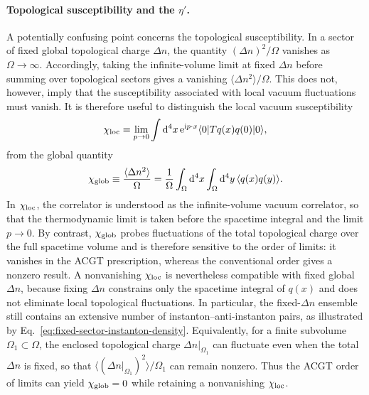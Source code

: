 \documentclass[review]{elsarticle}
\numberwithin{equation}{section}
\numberwithin{table}{section}
\numberwithin{figure}{section}
\def\d{\mathrm{d}}
\def\i{\mathrm{i}}
\def\e{\mathrm{e}}
\begin{document}
\paragraph{Topological susceptibility and the \texorpdfstring{$\eta'$}{eta-prime}.}

A potentially confusing point concerns the topological susceptibility. In a sector of fixed global topological charge $\Delta n$, the quantity $(\Delta n)^2/\Omega$ vanishes as $\Omega\to\infty$. Accordingly, taking the infinite-volume limit at fixed $\Delta n$ before summing over topological sectors gives a vanishing $\langle\Delta n^2\rangle/\Omega$. This does not, however, imply that the susceptibility associated with local vacuum fluctuations must vanish. It is therefore useful to distinguish the local vacuum susceptibility~\cite{Ai:2020ptm,Ai:2025quf}
\begin{align}
    \chi_{\rm loc}
    \equiv
    \lim_{p\to0}
    \int\d^4x\,
    \e^{\i p\cdot x}
    \langle0|
        T q(x)q(0)
    |0\rangle ,
    \label{eq:local-topological-susceptibility-reassessment}
\end{align}
from the global quantity
\begin{align}
    \chi_{\rm glob}
    \equiv
    \frac{\langle\Delta n^2\rangle}{\Omega}
    =
    \frac{1}{\Omega}
    \int_\Omega\d^4x
    \int_\Omega\d^4y\,
    \langle q(x)q(y)\rangle .
\end{align}
In $\chi_{\rm loc}$, the correlator is understood as the infinite-volume vacuum correlator, so that the thermodynamic limit is taken before the spacetime integral and the limit $p\to0$. By contrast, $\chi_{\rm glob}$ probes fluctuations of the total topological charge over the full spacetime volume and is therefore sensitive to the order of limits: it vanishes in the ACGT prescription, whereas the conventional order gives a nonzero result. A nonvanishing $\chi_{\rm loc}$ is nevertheless compatible with fixed global $\Delta n$, because fixing $\Delta n$ constrains only the spacetime integral of $q(x)$ and does not eliminate local topological fluctuations. In particular, the fixed-$\Delta n$ ensemble still contains an extensive number of instanton--anti-instanton pairs, as illustrated by Eq.~\eqref{eq:fixed-sector-instanton-density}. Equivalently, for a finite subvolume $\Omega_1\subset\Omega$, the enclosed topological charge $\Delta n|_{\Omega_1}$ can fluctuate even when the total $\Delta n$ is fixed, so that $\langle(\Delta n|_{\Omega_1})^2\rangle/\Omega_1$ can remain nonzero. Thus the ACGT order of limits can yield $\chi_{\rm glob}=0$ while retaining a nonvanishing $\chi_{\rm loc}$.
\end{document}
